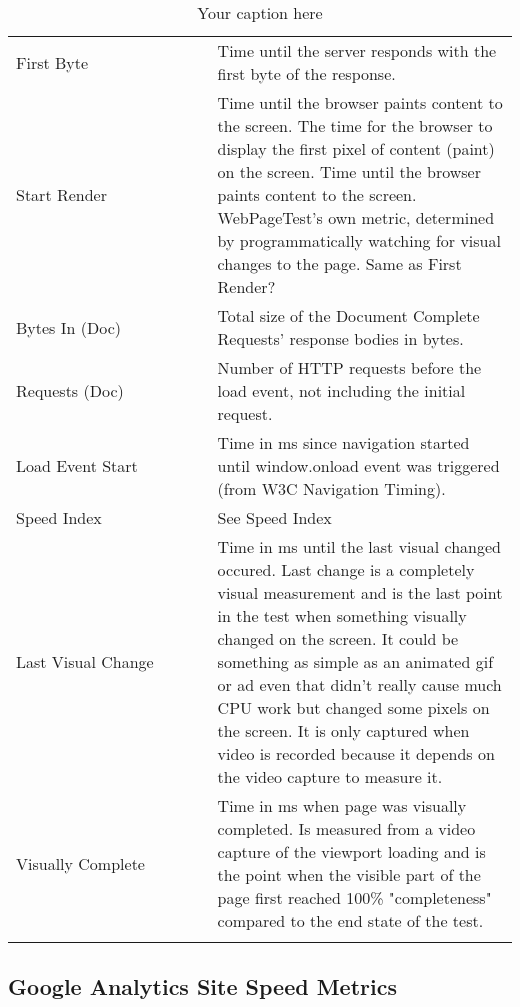 \begin{center}
\begin{longtable}{ p{0.4\linewidth} | p{0.6\linewidth} }
	First Byte & Time until the server responds with the first byte of the response.  \\
	
	Start Render & Time until the browser paints content to the screen. The time for the browser to display the first pixel of content (paint) on the screen. Time until the browser paints content to the screen. WebPageTest's own metric, determined by programmatically watching for visual changes to the page. Same as First Render? \\
	
	Bytes In (Doc) & Total size of the Document Complete Requests' response bodies in bytes.  \\
	
	Requests (Doc) & Number of HTTP requests before the load event, not including the initial request. \\
	
	Load Event Start & Time in ms since navigation started until window.onload event was triggered (from W3C Navigation Timing). \\
	
	Speed Index	& See Speed Index  \\
	
	Last Visual Change & Time in ms until the last visual changed occured. Last change is a completely visual measurement and is the last point in the test when something visually changed on the screen. It could be something as simple as an animated gif or ad even that didn't really cause much CPU work but changed some pixels on the screen. It is only captured when video is recorded because it depends on the video capture to measure it. \\
	
	Visually Complete & Time in ms when page was visually completed. Is measured from a video capture of the viewport loading and is the point when the visible part of the page first reached 100\% "completeness" compared to the end state of the test. \\
	\caption{Your caption here} %
	\label{tab:myfirstlongtable}
	\end{longtable}
\end{center}





\subsection{Google Analytics Site Speed Metrics}


